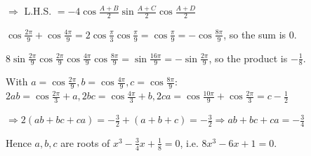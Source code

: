   $\Rightarrow$ L.H.S. $= -4\cos\frac{A + B}{2}\sin\frac{A + C}{2}\cos\frac{A + D}{2}$

\item $\cos\frac{2\pi}{9} + \cos\frac{4\pi}{9} = 2\cos\frac{\pi}{3}\cos\frac{\pi}{9} = \cos\frac{\pi}{9} =
  -\cos\frac{8\pi}{9}$, so the sum is $0$.

  $8\sin\frac{2\pi}{9}\cos\frac{2\pi}{9}\cos\frac{4\pi}{9}\cos\frac{8\pi}{9} = \sin\frac{16\pi}{9} = -\sin\frac{2\pi}{9}$, so
  the product is $-\frac{1}{8}$.

  With $a = \cos\frac{2\pi}{9}, b = \cos\frac{4\pi}{9}, c = \cos\frac{8\pi}{9}$: $2ab = \cos\frac{2\pi}{3} + a, 2bc =
  \cos\frac{4\pi}{3} + b, 2ca = \cos\frac{10\pi}{9} + \cos\frac{2\pi}{3} = c - \frac{1}{2}$

  $\Rightarrow 2(ab + bc + ca) = -\frac{3}{2} + (a + b + c) = -\frac{3}{2} \Rightarrow ab + bc + ca = -\frac{3}{4}$

  Hence $a, b, c$ are roots of $x^3 - \frac{3}{4}x + \frac{1}{8} = 0$, i.e. $8x^3 - 6x + 1 = 0$.
\stopitemize
